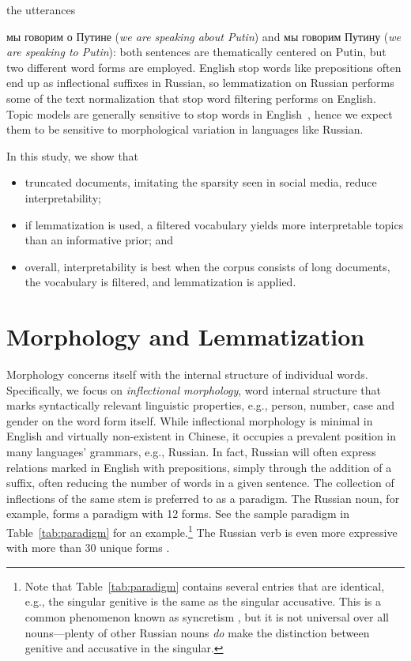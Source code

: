 \documentclass[11pt,letterpaper]{article}
\begin{document}
the utterances {{мы говорим о Путине} ({\em we
    are speaking about Putin}) and {{мы
      говорим Путину} ({\em we are speaking to Putin})}: both sentences
  are thematically centered on Putin, but two different word forms
  are employed.
English stop words like prepositions often end up as inflectional
suffixes in Russian, so lemmatization on Russian performs some
of the text normalization that stop word filtering performs on English.
Topic models are generally sensitive to stop
words in English~\cite{wallach2009,blei2010,eisenstein2011}, hence we
expect them to be sensitive to morphological variation in languages
like Russian.

In this study, we show that
\begin{itemize}
    \item truncated documents, imitating the sparsity seen in social
        media, reduce interpretability;
    \item if lemmatization is used, a filtered vocabulary yields more
        interpretable topics than an informative prior; and
    \item overall, interpretability is best when the corpus consists
        of long documents, the vocabulary is filtered, and lemmatization
        is applied.
\end{itemize}


\section{Morphology and Lemmatization}\label{sec:inflectional}

Morphology concerns itself with the internal structure of individual
words.  Specifically, we focus on {\em inflectional morphology}, word
internal structure that marks syntactically relevant linguistic
properties, e.g., person, number, case and gender on the word form
itself. While inflectional morphology is minimal in English and
virtually non-existent in Chinese, it occupies a prevalent position in
many languages' grammars, e.g., Russian. In fact, Russian will often
express relations marked in English with prepositions, simply through
the addition of a suffix, often reducing the number of words in a
given sentence. The collection of inflections of the same stem is preferred to as a
paradigm.  The Russian noun, for example, forms a paradigm with 12
forms.  See the sample paradigm in Table~\ref{tab:paradigm} for an
example.\footnote{Note that Table~\ref{tab:paradigm} contains several
  entries that are identical, e.g., the singular genitive is the same
  as the singular accusative. This is a common phenomenon known as
  syncretism \cite{baerman2005syntax}, but it is not universal over all nouns---plenty of other
  Russian nouns {\em do} make the distinction between
  genitive and accusative in the singular.} The Russian verb is even more expressive with more
than 30 unique forms \cite{wade2010comprehensive}.

}
\end{document}
